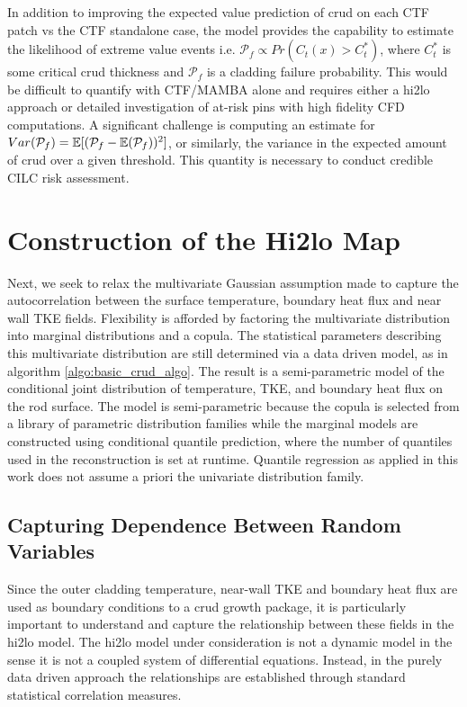 In addition to improving the expected value prediction of crud on each CTF patch vs the CTF standalone case, the model provides the capability to estimate the likelihood of extreme value events i.e. $\mathcal P_f \propto Pr(C_t(x) > C_t^*)$, where $C_t^*$ is some critical crud thickness and $\mathcal P_f$ is a cladding failure probability.  This would be difficult to quantify with CTF/MAMBA alone and requires either a hi2lo approach or detailed investigation of at-risk pins with high fidelity CFD computations.  A significant challenge is computing an estimate for $Var(\mathcal P_f) = \operatorname*{\mathbb{E}}[(\mathcal P_f - \operatorname*{\mathbb{E}}(\mathcal P_f))^2]$, or similarly, the variance in the expected amount of crud over a given threshold.  This quantity is necessary to conduct credible CILC risk assessment.


\section{Construction of the Hi2lo Map}

Next, we seek to relax the multivariate Gaussian assumption made to capture the autocorrelation between the surface temperature, boundary heat flux and near wall TKE fields.  Flexibility is afforded by factoring the multivariate distribution into marginal distributions and a copula.  The statistical parameters describing this multivariate distribution are still determined via a data driven model, as in algorithm \ref{algo:basic_crud_algo}.
The result is a semi-parametric model of the conditional joint distribution of temperature, TKE, and boundary heat flux on the rod surface.  The model is semi-parametric because the copula is selected from a library of parametric distribution families while the marginal models are constructed using conditional quantile prediction, where the number of quantiles used in the reconstruction is set at runtime.  Quantile regression as applied in this work does not assume a priori the univariate distribution family.

\subsection{Capturing Dependence Between Random Variables}

Since the outer cladding temperature, near-wall TKE and boundary heat flux are used as boundary conditions to a crud growth package, it is particularly important to understand and capture the relationship between these fields in the hi2lo model.  The hi2lo model under consideration is not a dynamic model in the sense it is not a coupled system of differential equations.  Instead, in the purely data driven approach the relationships are established through standard statistical correlation measures.

